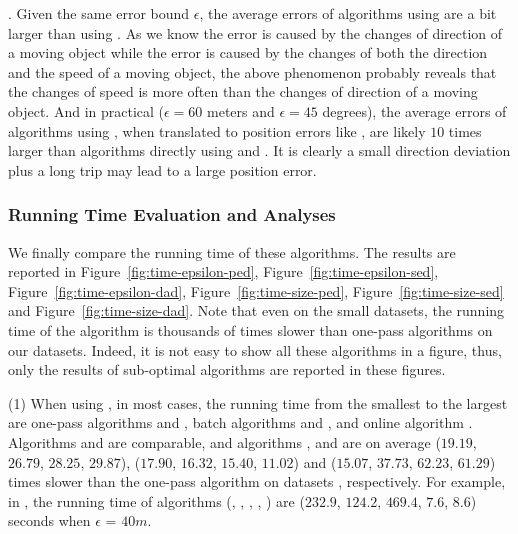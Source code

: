 .
Given the same error bound $\epsilon$, the average errors of algorithms using \sed are a bit larger than using \ped. {As we know the \ped error is caused by the changes of direction of a moving object while the \sed error is caused by the changes of both the direction and the speed of a moving object, the above phenomenon probably reveals that the changes of speed is more often than the changes of direction of a moving object.}
%
And in practical (\eg $\epsilon = 60$ meters and $\epsilon = 45$ degrees), the average errors of algorithms using \dad, when translated to position errors like \ped, are likely $10$ times larger than algorithms directly using \ped and \sed. It is clearly a small direction deviation plus a long trip may lead to a large position error.





\vspace{-1ex}
\subsubsection{Running Time Evaluation and Analyses}

We finally compare the running time of these algorithms.
The results are reported in Figure~\ref{fig:time-epsilon-ped}, Figure~\ref{fig:time-epsilon-sed}, Figure~\ref{fig:time-epsilon-dad}, Figure~\ref{fig:time-size-ped}, Figure~\ref{fig:time-size-sed} and Figure~\ref{fig:time-size-dad}.
Note that even on the small datasets, the running time of the \opt algorithm is thousands of times slower than one-pass algorithms on our datasets. Indeed, it is not easy to show all these algorithms in a figure, thus, only the results of sub-optimal algorithms are reported in these figures.

\sstab (1) When using \ped, in most cases, the running time from the smallest to the largest are one-pass algorithms \siped and \operb, batch algorithms \tpa and \dpa, and online algorithm \bqsa.
Algorithms \siped and \operb are comparable, and algorithms \tpa, \dpa and \bqsa are on average
($19.19$, $26.79$, $28.25$, $29.87$), ($17.90$, $16.32$, $15.40$, $11.02$) and ($15.07$, $37.73$, $62.23$, $61.29$)
times slower than the one-pass algorithm \siped on datasets \dSets, respectively.
%
For example, in \mopsi, the running time of algorithms
(\tpa, \dpa, \bqsa, \siped, \operb ) are ($232.9$, $124.2$, $469.4$, $7.6$, $8.6$) seconds when $\epsilon$ = $40m$.

